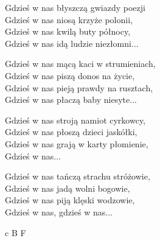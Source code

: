 \begin{text}
    Gdzieś w nas błyszczą gwiazdy poezji\\
    Gdzieś w nas niosą krzyże polonii,\\
    Gdzieś w nas kwilą buty północy,\\
    Gdzieś w nas idą ludzie niezłomni...

    Gdzieś w nas mącą kaci w strumieniach,\\
    Gdzieś w nas piszą donos na życie,\\
    Gdzieś w nas pieją prawdy na rusztach,\\
    Gdzieś w nas płaczą baby niesyte...

    Gdzieś w nas stroją namiot cyrkowcy,\\
    Gdzieś w nas płoszą dzieci jaskółki,\\
    Gdzieś w nas grają w karty płomienie,\\
    Gdzieś w nas...

    Gdzieś w nas tańczą strachu stróżowie,\\
    Gdzieś w nas jadą wolni bogowie,\\
    Gdzieś w nas piją klęski wodzowie,\\
    Gdzieś w nas, gdzieś w nas...
\end{text}
\begin{chord}
    c B F
\end{chord}